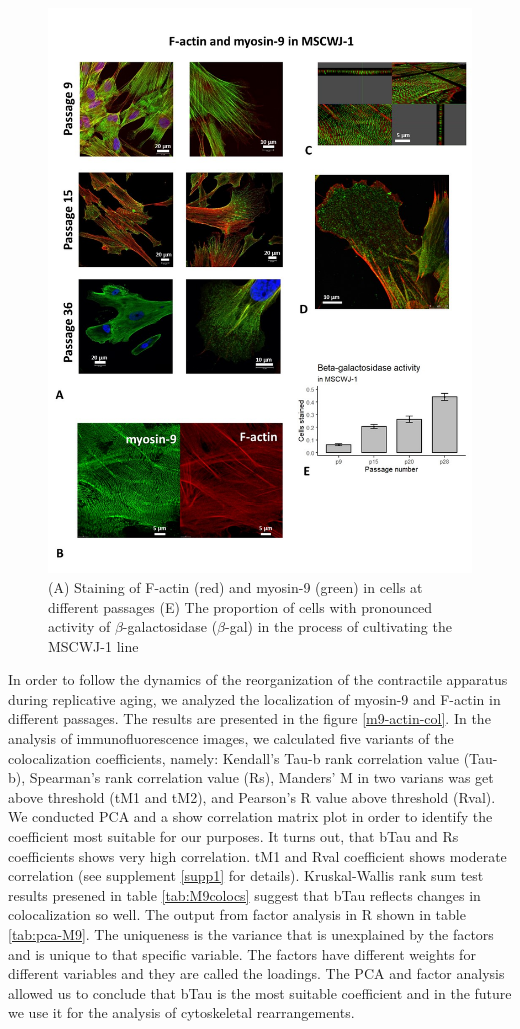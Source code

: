 \documentclass[english,authoryear]{elsarticle}
\begin{document}
\begin{figure}[hbt!]
  \label{m9-actin-bgal}
\centering
\includegraphics[width=0.9\linewidth]{fig_m9-actin-bgal.jpg}
\caption{(A) Staining of F-actin (red) and myosin-9 (green) in cells at different passages (E) The proportion of cells with pronounced activity of $\beta$-galactosidase ($\beta$-gal) in the process of cultivating the MSCWJ-1 line}
\end{figure}


In order to follow the dynamics of the reorganization of the contractile apparatus during replicative aging, we analyzed the localization of myosin-9 and F-actin in different passages.
The results are presented in the figure \ref{m9-actin-col}.
In the analysis of immunofluorescence images, we calculated five variants of the colocalization coefficients, namely: Kendall's Tau-b rank correlation value (Tau-b), Spearman's rank correlation value (Rs), Manders' M in two varians was get above threshold (tM1 and tM2), and Pearson's R value above threshold (Rval).
We conducted PCA and a show correlation matrix plot in order to identify the coefficient most suitable for our purposes.
It turns out, that bTau and Rs coefficients shows very high correlation.
tM1 and Rval coefficient shows moderate correlation (see supplement \ref{supp1} for details).
Kruskal-Wallis rank sum test results presened in table \ref{tab:M9colocs} suggest that bTau reflects changes in colocalization so well.
The output from factor analysis in R shown in table \ref{tab:pca-M9}.
The uniqueness is the variance that is unexplained by the factors and is unique to that specific variable.
The factors have different weights for different variables and they are called the loadings.
The PCA and factor analysis allowed us to conclude that bTau is the most suitable coefficient and in the future we use it for the analysis of cytoskeletal rearrangements.
\end{document}
